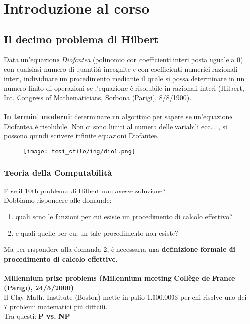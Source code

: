 \chapter{Introduzione al corso}
\section{Il decimo problema di Hilbert}
Data un’equazione \textit{Diofantea} (polinomio con coefficienti interi posta uguale a 0) con qualsiasi numero di quantità incognite e con coefficienti numerici razionali interi, individuare un procedimento mediante il quale si possa determinare in un numero finito di operazioni se l’equazione è risolubile in razionali interi (Hilbert, Int. Congress of Mathematicians, Sorbona (Parigi), 8/8/1900).\\\\
\textbf{In termini moderni}: determinare un algoritmo per sapere se un’equazione Diofantea è risolubile. Non ci sono limiti al numero delle variabili ecc... , si possono quindi scrivere infinite equazioni Diofantee.
\begin{figure}[H]
	\centering
    \texttt{[image: tesi\_stile/img/dio1.png]}
\end{figure}

\subsection{Teoria della Computabilità}
E se il 10th problema di Hilbert non avesse soluzione?\\
Dobbiamo rispondere alle domande:
\begin{enumerate}
    \item quali sono le funzioni per cui esiste un procedimento di calcolo effettivo?
    \item e quali quelle per cui un tale procedimento non esiste?
\end{enumerate}
Ma per rispondere alla domanda 2, è necessaria una \textbf{definizione formale di procedimento di calcolo effettivo}.\\\\
\textbf{Millennium prize problems (Millennium meeting Collège de France (Parigi), 24/5/2000)}\\
Il Clay Math. Institute (Boston) mette in palio 1.000.000\$ per chi risolve uno dei 7 problemi matematici più difficili.\\
Tra questi: \textbf{P vs. NP}

